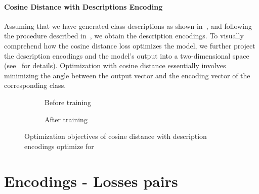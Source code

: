 \paragraph{Cosine Distance with Descriptions Encoding} Assuming that we have generated class descriptions as shown in~, and following the procedure described in~, we obtain the description encodings.
To visually comprehend how the cosine distance loss optimizes the model, we further project the description encodings and the model's output into a two-dimensional space (see~ for details). Optimization with cosine distance essentially involves minimizing the angle between the output vector and the encoding vector of the corresponding class.
\begin{figure}[htbp]
  \begin{subfigure}{0.45\textwidth}
    \caption{Before training}
    \label{fig:03/cd-desc-before}
  \end{subfigure}
  \begin{subfigure}{0.45\textwidth}
    \caption{After training}
    \label{fig:03/cd-desc-after}
  \end{subfigure}
  \caption{Optimization objectives of cosine distance with description encodings optimize for}
\end{figure}

\section{Encodings - Losses pairs}
\label{sec:encodings-losses-pairs}

